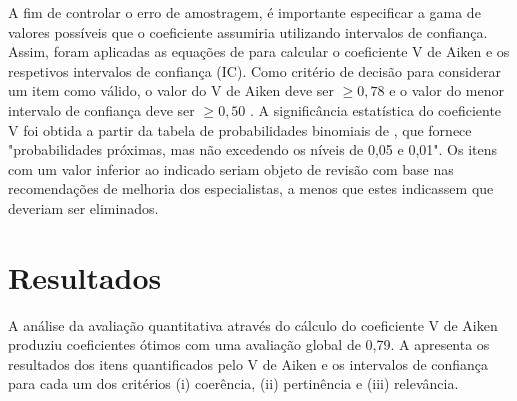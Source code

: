 \documentclass[portuguese]{textolivre}
\begin{document}
A fim de controlar o erro de amostragem, é importante especificar a gama de valores possíveis que o coeficiente assumiria utilizando intervalos de confiança. Assim, foram aplicadas as equações de \textcite{penfield_applying_2004} para calcular o coeficiente V de Aiken e os respetivos intervalos de confiança (IC). Como critério de decisão para considerar um item como válido, o valor do V de Aiken deve ser $\geq 0,78$ e o valor do menor intervalo de confiança deve ser $\geq 0,50$ \cite{cicchetti_guidelines_1994}. A significância estatística do coeficiente V foi obtida a partir da tabela de probabilidades binomiais de \textcite[p. 133]{aiken_three_1985}, que fornece "probabilidades próximas, mas não excedendo os níveis de 0,05 e 0,01". Os itens com um valor inferior ao indicado seriam objeto de revisão com base nas recomendações de melhoria dos especialistas, a menos que estes indicassem que deveriam ser eliminados.

\section{Resultados}\label{sec-organizacao}
A análise da avaliação quantitativa através do cálculo do coeficiente V de Aiken produziu coeficientes ótimos com uma avaliação global de 0,79. A  apresenta os resultados dos itens quantificados pelo V de Aiken e os intervalos de confiança para cada um dos critérios (i) coerência, (ii) pertinência e (iii) relevância.
\end{document}
